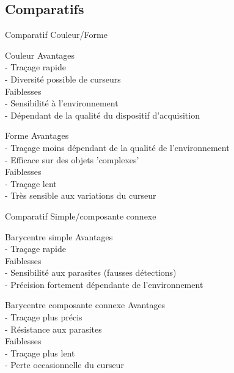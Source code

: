 \documentclass{beamer}
\begin{document}
		\subsection{Comparatifs}
		\begin{frame}{Comparatif Couleur/Forme}
		\pause
			\begin{block}{Couleur}
				Avantages \\
				- Traçage rapide \\
				- Diversité possible de curseurs \\
				Faiblesses \\
				- Sensibilité à l'environnement\\
				- Dépendant de la qualité du dispositif d'acquisition\\
			\end{block}
			\pause
			\begin{block}{Forme}
				Avantages \\
				- Traçage moins dépendant de la qualité de l'environnement \\
				- Efficace sur des objets 'complexes'\\
				Faiblesses \\
				- Traçage lent \\
				- Très sensible aux variations du curseur\\
			\end{block}
		\end{frame}
		\begin{frame}{Comparatif Simple/composante connexe}
		\pause
			\begin{block}{Barycentre simple}
				Avantages \\
				- Traçage rapide \\
				Faiblesses \\
				- Sensibilité aux parasites (fausses détections)\\
				- Précision fortement dépendante de l'environnement\\
			\end{block}
			\pause
			\begin{block}{Barycentre composante connexe}
				Avantages \\
				- Traçage plus précis \\
				- Résistance aux parasites \\
				Faiblesses \\
				- Traçage plus lent \\
				- Perte occasionnelle du curseur
			\end{block}
		\end{frame}
\end{document}
